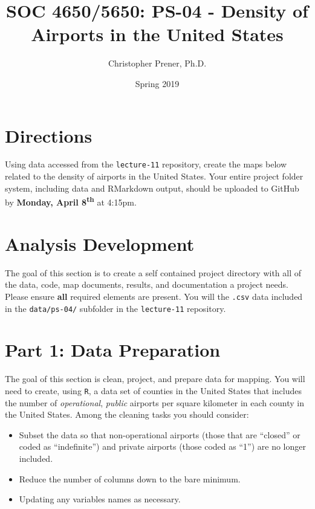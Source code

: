 \documentclass{tufte-handout}
\title{SOC 4650/5650: PS-04 - Density of Airports in the United States}
\author{Christopher Prener, Ph.D.}
\date{Spring 2019}
\begin{document}

\maketitle %


\vspace{5mm}
\section{Directions}
Using data accessed from the \texttt{lecture-11} repository, create the maps below related to the density of airports in the United States. Your entire project folder system, including data and RMarkdown output, should be uploaded to GitHub by \textbf{Monday, April 8\textsuperscript{th}} at 4:15pm.

\vspace{5mm}
\section{Analysis Development}
The goal of this section is to create a self contained project directory with all of the data, code, map documents, results, and documentation a project needs. Please ensure \textbf{all} required elements are present. You will the \texttt{.csv} data included in the \texttt{data/ps-04/} subfolder in the \texttt{lecture-11} repository.

\vspace{5mm}
\section{Part 1: Data Preparation}
The goal of this section is clean, project, and prepare data for mapping. You will need to create, using \texttt{R}, a data set of counties in the United States that includes the number of \textit{operational}, \textit{public} airports per square kilometer in each county in the United States. Among the cleaning tasks you should consider:
\begin{itemize}
\item Subset the data so that non-operational airports (those that are ``closed'' or coded as ``indefinite'')  and private airports (those coded as ``1'') are no longer included.
\item Reduce the number of columns down to the bare minimum.
\item Updating any variables names as necessary.
\end{itemize}
\end{document}
